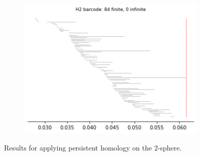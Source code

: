 \begin{figure}[H]
\begin{subfigure}[b]{0.24\textwidth}
\includegraphics[width=\textwidth]{figures/dsphere_H2_barcode.png}
 \caption{}
\end{subfigure}
\caption{Results for applying persistent homology on the $2$-sphere.}
\end{figure}


